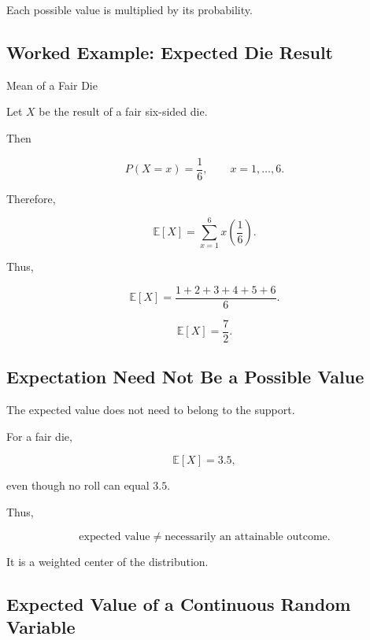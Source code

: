 Each possible value is multiplied by its probability.

\subsection{Worked Example: Expected Die Result}
\label{subsec:worked-expected-die}

\begin{workedexamplebox}{Mean of a Fair Die}

Let \(X\) be the result of a fair six-sided die.

Then

\[
P(X=x)=\frac16,
\qquad
x=1,\ldots,6.
\]

Therefore,

\[
\mathbb{E}[X]
=
\sum_{x=1}^{6}
x\left(\frac16\right).
\]

Thus,

\[
\mathbb{E}[X]
=
\frac{1+2+3+4+5+6}{6}.
\]

\begin{answerbox}
\[
\boxed{
\mathbb{E}[X]
=
\frac72.
}
\]
\end{answerbox}

\end{workedexamplebox}

\subsection{Expectation Need Not Be a Possible Value}
\label{subsec:expectation-not-possible-value}

The expected value does not need to belong to the support.

For a fair die,

\[
\mathbb{E}[X]
=
3.5,
\]

even though no roll can equal \(3.5\).

Thus,

\[
\boxed{
\text{expected value}
\neq
\text{necessarily an attainable outcome}.
}
\]

It is a weighted center of the distribution.

\subsection{Expected Value of a Continuous Random Variable}
\label{subsec:continuous-expectation}

